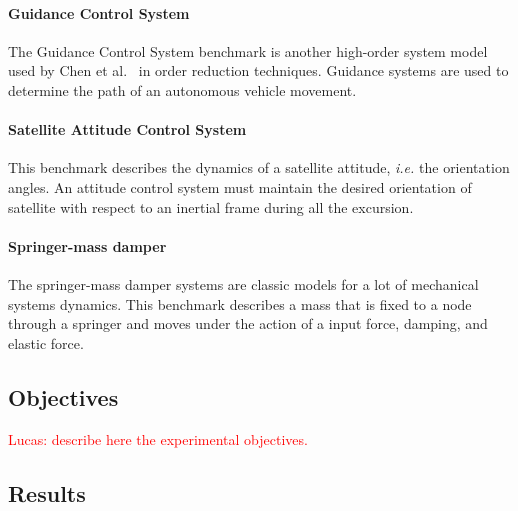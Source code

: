 \documentclass[twocolumn]{autart}    %
\begin{document}
\paragraph*{Guidance Control System}

The Guidance Control System benchmark is another high-order system 
model used by Chen et al.~\cite{CHEN1979389}  in order reduction 
techniques. Guidance systems are used to determine the path of an 
autonomous vehicle movement.

\paragraph*{Satellite Attitude Control System}

This benchmark describes the dynamics of a satellite attitude, 
{\it i.e.} the orientation angles. An attitude control system must 
maintain the desired orientation of satellite with respect to an 
inertial frame during all the excursion. 

\paragraph*{Springer-mass damper}

The springer-mass damper systems are classic models for a lot of 
mechanical systems dynamics. This benchmark describes a mass that is 
fixed to a node through a springer and moves under the action of a 
input force, damping, and elastic force.



\subsection{Objectives}
\label{exp:objectives}

\textcolor{red}{Lucas: describe here the experimental objectives.}

\subsection{Results}
\label{exp:results}
\end{document}
